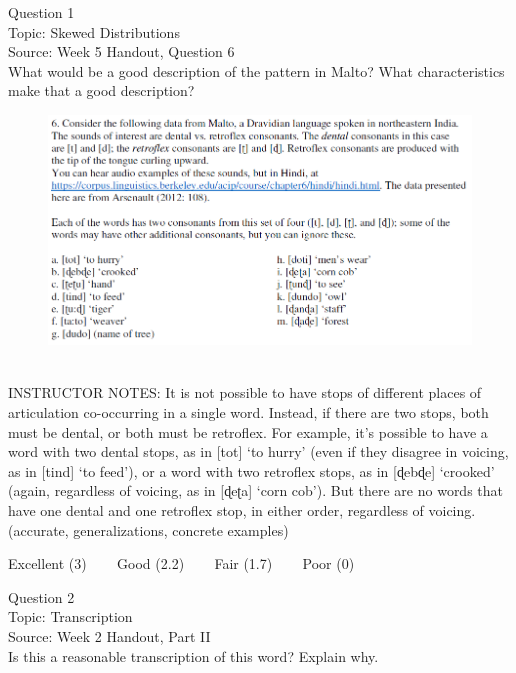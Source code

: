\documentclass[12pt]{article}
\begin{document}
{\large Question 1}\\

Topic: Skewed Distributions\\
Source: Week 5 Handout, Question 6\\

What would be a good description of the pattern in Malto? What characteristics make that a good description?\\

\begin{figure}[H]
\includegraphics{../images/malto.png}
\end{figure}

~\\
INSTRUCTOR NOTES: It is not possible to have stops of different places of articulation co-occurring in a single word. Instead, if there are two stops, both must be dental, or both must be retroflex. For example, it’s possible to have a word with two dental stops, as in [tot] ‘to hurry’ (even if they disagree in voicing, as in [tind] ‘to feed’), or a word with two retroflex stops, as in [ɖebɖe] ‘crooked’ (again, regardless of voicing, as in [ɖeʈa] ‘corn cob’). But there are no words that have one dental and one retroflex stop, in either order, regardless of voicing. (accurate, generalizations, concrete examples)


\vfill
Excellent (3) ~~~ Good (2.2) ~~~ Fair (1.7) ~~~ Poor (0)
\newpage

{\large Question 2}\\

Topic: Transcription\\
Source: Week 2 Handout, Part II\\

Is this a reasonable transcription of this word? Explain why.\\
\end{document}

